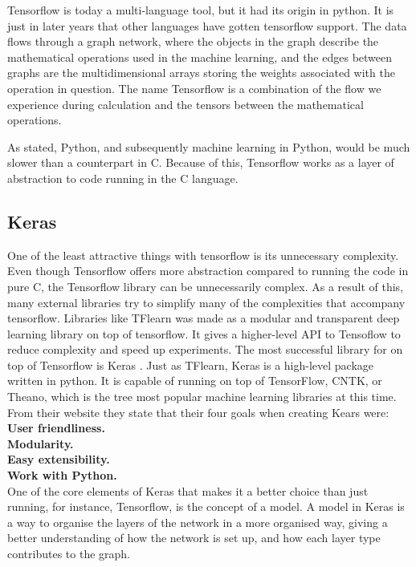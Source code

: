 
Tensorflow is today a multi-language tool, but it had its origin in python. It is just in later years that other languages have gotten tensorflow support.  
The data flows through a graph network, where the objects in the graph describe the mathematical operations used in the machine learning, and the edges between graphs are the multidimensional arrays storing the weights associated with the operation in question. The name Tensorflow is a combination of the flow we experience during calculation and the tensors between the mathematical operations. 

As stated, Python, and subsequently machine learning in Python, would be much slower than a counterpart in C. Because of this, Tensorflow works as a layer of abstraction to code running in the C language. 
 



\subsection{Keras}
One of the least attractive things with tensorflow is its unnecessary complexity.  Even though Tensorflow offers more abstraction compared to running the code in pure C, the Tensorflow library can be unnecessarily complex.
As a result of this, many external libraries try to simplify many of the complexities that accompany tensorflow. 
Libraries like TFlearn was made as a modular and transparent deep learning library on top of tensorflow. It gives a higher-level API to Tensoflow to reduce complexity and speed up experiments. 
The most successful library for on top of Tensorflow is Keras . 
Just as TFlearn, Keras is a high-level package written in python. It is capable of running on top of TensorFlow, CNTK, or Theano, which is the tree most popular machine learning libraries at this time. 
From their website they state that their four goals when creating Kears were:
\textbf{User friendliness. }\\
\textbf{Modularity. }\\
\textbf{Easy extensibility.}\\ 
\textbf{Work with Python. }\\

One of the core elements of Keras that makes it a better choice than just running, for instance, Tensorflow, is the concept of a model. A model in Keras is a way to organise the layers of the network in a more organised way, giving a better understanding of how the network is set up, and how each layer type contributes to the graph. 

